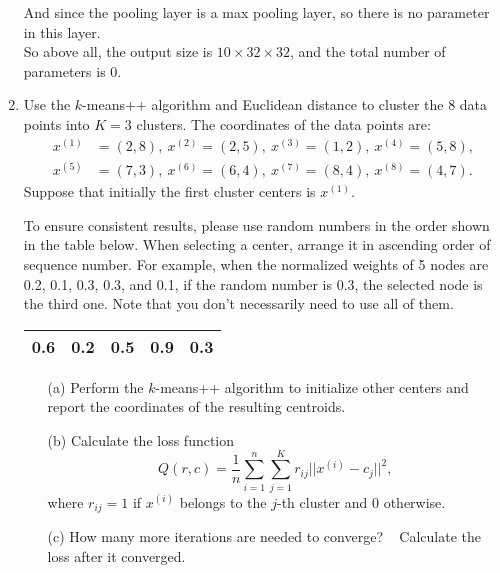 \documentclass[10pt]{article}
\begin{document}
\begin{enumerate}[1.]
And since the pooling layer is a max pooling layer, so there is no parameter in this layer.\\

So above all, the output size is $10\times 32\times 32$, and the total number of parameters is $0$.\\
	
	\newpage
	
	\item {} Use the $k$-means++ algorithm and Euclidean distance to cluster the 8 data points into $K=3$ clusters.
	      The coordinates of the data points are:
	      \begin{align*}
		      x^{(1)} & = (2,8),  \ x^{(2)} = (2,5), \ x^{(3)} = (1,2), \ x^{(4)} = (5,8), \\
		      x^{(5)} & = (7,3),  \ x^{(6)} = (6,4), \ x^{(7)} = (8,4), \ x^{(8)} = (4,7).
	      \end{align*}
	      Suppose that initially the first cluster centers is $x^{(1)}$. \\
	      {\color{blue} To ensure consistent results, please use random numbers in the order shown in the table below. When selecting a center, arrange it in ascending order of sequence number. For example, when the normalized weights of 5 nodes are 0.2, 0.1, 0.3, 0.3, and 0.1, if the random number is 0.3, the selected node is the third one. Note that you don't necessarily need to use all of them.\\
	      \begin{tabular}{|c|c|c|c|c|}
	      	\hline
	      	0.6 & 0.2 & 0.5 & 0.9 & 0.3 \\
	      	\hline
	      \end{tabular}
	      }
	      \begin{itemize}
		      \item[(a)] Perform the $k$-means++ algorithm to initialize other centers and report the coordinates of the resulting centroids. ~
		      \item[(b)] Calculate the loss function
		            \begin{equation}
			            Q(r,c) = \frac{1}{n} \sum_{i=1}^n \sum_{j=1}^K r_{ij}||x^{(i)} - c_j||^2,
		            \end{equation}
		            where $r_{ij} = 1$ if $x^{(i)}$ belongs to the $j$-th cluster and 0 otherwise. ~
		      \item[(c)] How many more iterations are needed to converge? ~ Calculate the loss after it converged.~
	      \end{itemize}
		

\end{enumerate}
\end{document}
